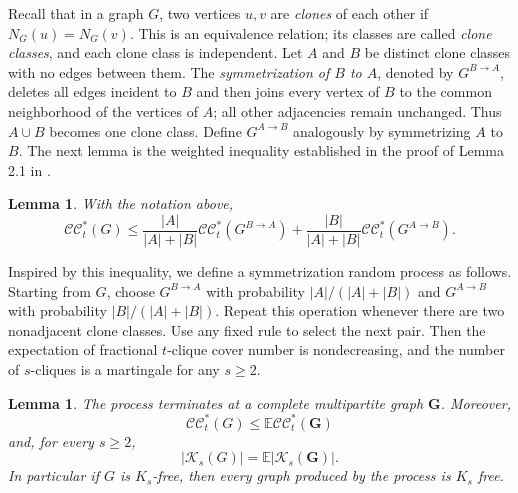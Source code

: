\documentclass[11pt]{article}
\numberwithin{equation}{section}
\newtheorem{lemma}[theorem]{Lemma}
\theoremstyle{remark}
\newcommand{\CCstar}{\mathcal{CC}^{*}}
\begin{document}
Recall that in a graph \(G\), two vertices \(u,v\) are \emph{clones} of each other if \(N_G(u)=N_G(v)\).
This is an equivalence relation; its classes are called \emph{clone classes}, and each
clone class is independent. Let \(A\) and \(B\) be distinct clone classes with no edges between them.
The \emph{symmetrization of \(B\) to \(A\)}, denoted by \(G^{B\to A}\), deletes all
edges incident to \(B\) and then joins every vertex of \(B\) to
the common neighborhood of the vertices of \(A\); all other adjacencies
remain unchanged. Thus \(A\cup B\) becomes one clone class.  Define \(G^{A\to B}\)
analogously by symmetrizing \(A\) to \(B\). The next lemma is the weighted inequality
established in the proof of Lemma 2.1 in \cite{BHKNW}.

\begin{lemma}
  \label{cov:lem:weighted-symmetrization}
With the notation above,
\begin{equation*}
\CCstar_t(G)\le \frac{|A|}{|A|+|B|}\CCstar_t(G^{B\to A})+\frac{|B|}{|A|+|B|}\CCstar_t(G^{A\to B}).
\end{equation*}
\end{lemma}

Inspired by this inequality, we define a symmetrization random process as follows.
Starting from \(G\), choose \(G^{B\to A}\) with probability \(|A|/(|A|+|B|)\) and \(G^{A\to B}\)
with probability \(|B|/(|A|+|B|)\). Repeat this operation whenever there are two nonadjacent clone classes.
Use any fixed rule to select the next pair. Then the expectation of fractional \(t\)-clique cover number
is nondecreasing, and the number of \(s\)-cliques is a martingale for any \(s\ge2\).

\begin{lemma}\label{cov:lem:random-symmetrization}
The process terminates at a complete multipartite graph \(\mathbf G\).  Moreover,
\begin{equation*}
\CCstar_t(G)\le \mathbb E \CCstar_t(\mathbf G)
\end{equation*}
and, for every \(s\ge 2\),
\begin{equation*}
|\mathcal{K}_s(G)|=\mathbb E |\mathcal K_s(\mathbf G)|.
\end{equation*}
In particular if \(G\) is \(K_s\)-free, then every graph produced by the process is \(K_s\) free.
\end{lemma}
\end{document}
